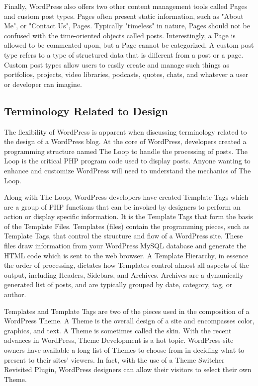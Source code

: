 Finally, WordPress also offers two other content management tools called Pages and custom post types. Pages often present static information, such as "About Me", or "Contact Us", Pages. Typically "timeless" in nature, Pages should not be confused with the time-oriented objects called posts. Interestingly, a Page is allowed to be commented upon, but a Page cannot be categorized. A custom post type refers to a type of structured data that is different from a post or a page. Custom post types allow users to easily create and manage such things as portfolios, projects, video libraries, podcasts, quotes, chats, and whatever a user or developer can imagine.

\subsection{Terminology Related to Design}

The flexibility of WordPress is apparent when discussing terminology related to the design of a WordPress blog. At the core of WordPress, developers created a programming structure named The Loop to handle the processing of posts. The Loop is the critical PHP program code used to display posts. Anyone wanting to enhance and customize WordPress will need to understand the mechanics of The Loop.

Along with The Loop, WordPress developers have created Template Tags which are a group of PHP functions that can be invoked by designers to perform an action or display specific information. It is the Template Tags that form the basis of the Template Files. Templates (files) contain the programming pieces, such as Template Tags, that control the structure and flow of a WordPress site. These files draw information from your WordPress MySQL database and generate the HTML code which is sent to the web browser. A Template Hierarchy, in essence the order of processing, dictates how Templates control almost all aspects of the output, including Headers, Sidebars, and Archives. Archives are a dynamically generated list of posts, and are typically grouped by date, category, tag, or author.

Templates and Template Tags are two of the pieces used in the composition of a WordPress Theme. A Theme is the overall design of a site and encompasses color, graphics, and text. A Theme is sometimes called the skin. With the recent advances in WordPress, Theme Development is a hot topic. WordPress-site owners have available a long list of Themes to choose from in deciding what to present to their sites' viewers. In fact, with the use of a Theme Switcher Revisited Plugin, WordPress designers can allow their visitors to select their own Theme.

